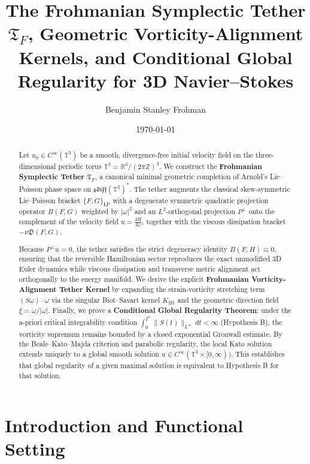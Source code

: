 \documentclass[11pt,reqno]{amsart}
\title[Frohmanian Symplectic Tether and Vorticity Alignment on $\mathbb{T}^3$]{The Frohmanian Symplectic Tether $\mathfrak{T}_F$, Geometric Vorticity-Alignment Kernels, and Conditional Global Regularity for 3D Navier--Stokes}
\author{Benjamin Stanley Frohman}
\date{\today}
\theoremstyle{definition}
\newcommand{\T}{\mathbb{T}^3}
\newcommand{\R}{\mathbb{R}}
\newcommand{\Z}{\mathbb{Z}}
\newcommand{\sdiff}{\mathfrak{sdiff}(\T)}
\newcommand{\TF}{\mathfrak{T}_F}
\newcommand{\KBS}{K_{\mathrm{BS}}}
\newcommand{\Pperp}{P^\perp}
\begin{document}
\begin{abstract}
Let $u_0 \in C^\infty(\T)$ be a smooth, divergence-free initial velocity field on the three-dimensional periodic torus $\T = \R^3 / (2\pi\Z)^3$. We construct the \textbf{Frohmanian Symplectic Tether} $\TF$, a canonical minimal geometric completion of Arnold's Lie--Poisson phase space on $\sdiff^*$. The tether augments the classical skew-symmetric Lie--Poisson bracket $\{F, G\}_{\mathrm{LP}}$ with a degenerate symmetric quadratic projection operator $B(F, G)$ weighted by $|\omega|^2$ and an $L^2$-orthogonal projection $\Pperp$ onto the complement of the velocity field $u = \frac{\delta H}{\delta \omega}$, together with the viscous dissipation bracket $-\nu \mathfrak{D}(F, G)$.

Because $\Pperp u = 0$, the tether satisfies the strict degeneracy identity $B(F, H) \equiv 0$, ensuring that the reversible Hamiltonian sector reproduces the exact unmodified 3D Euler dynamics while viscous dissipation and transverse metric alignment act orthogonally to the energy manifold. We derive the explicit \textbf{Frohmanian Vorticity-Alignment Tether Kernel} by expanding the strain-vorticity stretching term $(S\omega)\cdot\omega$ via the singular Biot--Savart kernel $\KBS$ and the geometric direction field $\xi = \omega / |\omega|$. Finally, we prove a \textbf{Conditional Global Regularity Theorem}: under the a-priori critical integrability condition $\int_0^{T^*} \|S(t)\|_{L^\infty}\,dt < \infty$ (Hypothesis B), the vorticity supremum remains bounded by a closed exponential Gronwall estimate. By the Beale--Kato--Majda criterion and parabolic regularity, the local Kato solution extends uniquely to a global smooth solution $u \in C^\infty(\T \times [0, \infty))$. This establishes that global regularity of a given maximal solution is equivalent to Hypothesis B for that solution.
\end{abstract}

\maketitle

\section{Introduction and Functional Setting}
\end{document}
